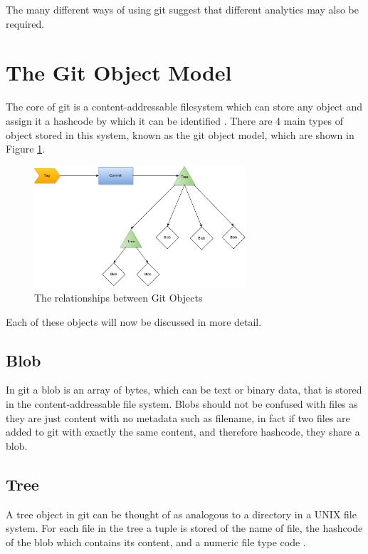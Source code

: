 \documentclass[11pt]{book}
\begin{document}
The many different ways of using git suggest that different analytics may also be required.

\clearpage

\section{The Git Object Model}
The core of git is a content-addressable filesystem which can store any object and assign it a hashcode by which it can be identified \cite{progit}. There are 4 main types of object stored in this system, known as the git object model, which are shown in Figure \ref{fig:gitobjectmodeldiagram}.

\begin{figure}[h]
	\centering
	\includegraphics[width=0.7\textwidth]{images/gitobjectmodel}
	\caption{The relationships between Git Objects}
	\label{fig:gitobjectmodeldiagram}
\end{figure} 

Each of these objects will now be discussed in more detail.

\subsection{Blob}
In git a blob is an array of bytes, which can be text or binary data, that is stored in the content-addressable file system. Blobs should not be confused with files as they are just content with no metadata such as filename, in fact if two files are added to git with exactly the same content, and therefore hashcode, they share a blob.

\subsection{Tree}
A tree object in git can be thought of as analogous to a directory in a UNIX file system. For each file in the tree a tuple is stored of the name of file, the hashcode of the blob which contains its content, and a numeric file type code \cite{gitmagic}.
\end{document}
